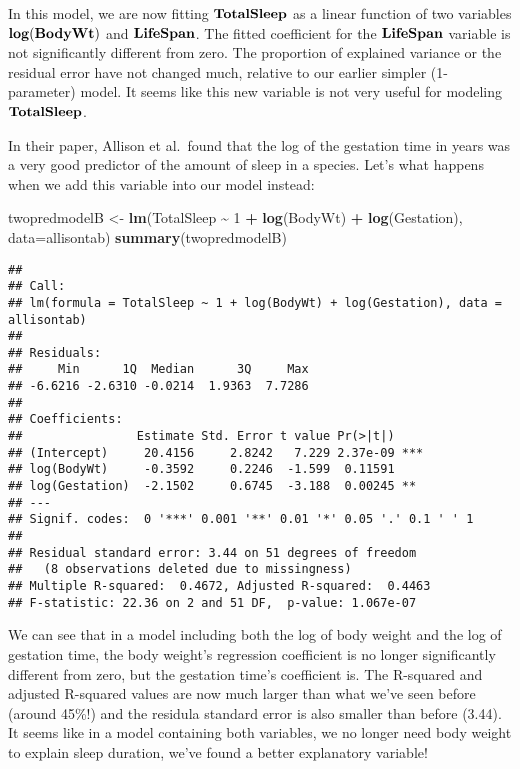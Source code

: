 \documentclass[
]{book}
\newenvironment{Shaded}{\begin{snugshade}}{\end{snugshade}}
\newcommand{\DataTypeTok}[1]{\textcolor[rgb]{0.13,0.29,0.53}{#1}}
\newcommand{\DecValTok}[1]{\textcolor[rgb]{0.00,0.00,0.81}{#1}}
\newcommand{\KeywordTok}[1]{\textcolor[rgb]{0.13,0.29,0.53}{\textbf{#1}}}
\newcommand{\NormalTok}[1]{#1}
\newcommand{\OperatorTok}[1]{\textcolor[rgb]{0.81,0.36,0.00}{\textbf{#1}}}
\newcommand{\StringTok}[1]{\textcolor[rgb]{0.31,0.60,0.02}{#1}}
\begin{document}
In this model, we are now fitting \(\bf{TotalSleep}\) as a linear function of two variables \(\bf{log(BodyWt)}\) and \(\bf{LifeSpan}\). The fitted coefficient for the \(\bf{LifeSpan}\) variable is not significantly different from zero. The proportion of explained variance or the residual error have not changed much, relative to our earlier simpler (1-parameter) model. It seems like this new variable is not very useful for modeling \(\bf{TotalSleep}\).

In their paper, Allison et al.~found that the log of the gestation time in years was a very good predictor of the amount of sleep in a species. Let's what happens when we add this variable into our model instead:

\begin{Shaded}
\begin{Highlighting}[]
\NormalTok{twopredmodelB \textless{}{-}}\StringTok{ }\KeywordTok{lm}\NormalTok{(TotalSleep }\OperatorTok{\textasciitilde{}}\StringTok{ }\DecValTok{1} \OperatorTok{+}\StringTok{ }\KeywordTok{log}\NormalTok{(BodyWt) }\OperatorTok{+}\StringTok{ }\KeywordTok{log}\NormalTok{(Gestation), }\DataTypeTok{data=}\NormalTok{allisontab)}
\KeywordTok{summary}\NormalTok{(twopredmodelB)}
\end{Highlighting}
\end{Shaded}

\begin{verbatim}
## 
## Call:
## lm(formula = TotalSleep ~ 1 + log(BodyWt) + log(Gestation), data = allisontab)
## 
## Residuals:
##     Min      1Q  Median      3Q     Max 
## -6.6216 -2.6310 -0.0214  1.9363  7.7286 
## 
## Coefficients:
##                Estimate Std. Error t value Pr(>|t|)    
## (Intercept)     20.4156     2.8242   7.229 2.37e-09 ***
## log(BodyWt)     -0.3592     0.2246  -1.599  0.11591    
## log(Gestation)  -2.1502     0.6745  -3.188  0.00245 ** 
## ---
## Signif. codes:  0 '***' 0.001 '**' 0.01 '*' 0.05 '.' 0.1 ' ' 1
## 
## Residual standard error: 3.44 on 51 degrees of freedom
##   (8 observations deleted due to missingness)
## Multiple R-squared:  0.4672, Adjusted R-squared:  0.4463 
## F-statistic: 22.36 on 2 and 51 DF,  p-value: 1.067e-07
\end{verbatim}

We can see that in a model including both the log of body weight and the log of gestation time, the body weight's regression coefficient is no longer significantly different from zero, but the gestation time's coefficient is. The R-squared and adjusted R-squared values are now much larger than what we've seen before (around 45\%!) and the residula standard error is also smaller than before (3.44). It seems like in a model containing both variables, we no longer need body weight to explain sleep duration, we've found a better explanatory variable!
\end{document}
